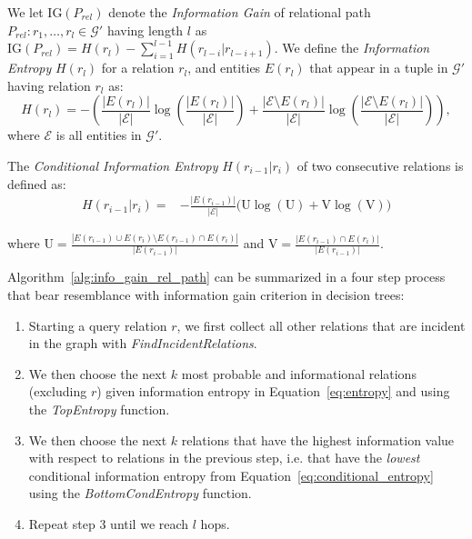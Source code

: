 \documentclass{article}
\newcommand{\set}[1]{\ensuremath{\mathcal{#1}}}
\newcommand{\entset}[0]{{\set{E}}}
\newcommand{\kg}[0]{{\set{G}}}
\begin{document}
We let $\text{IG}({P_{rel}})$ denote the \emph{Information Gain} of relational path $P_{rel}: r_1, \dotsc, r_l \in \kg'$ having length $l$  as $\text{IG}({P_{rel}}) = H(r_l) - \sum\limits_{i=1}^{l-1} H(r_{l-i}|r_{l-i+1})$.
We define the \emph{Information Entropy} $H(r_l)$ for a relation $r_l$, and entities $E(r_l)$ that appear in a tuple in $\kg'$ having relation $r_l$ as:
\begin{equation}
\scriptstyle
\label{eq:entropy}
    H(r_l) =  -\left(\frac{|E(r_l)|}{|\entset|}\log(\frac{|E(r_l)|}{|\entset|}) + \frac{|\entset \setminus E(r_l)|}{|\entset|}\log(\frac{|\entset \setminus E(r_l)|}{|\entset|})\right),
\end{equation}
where $\entset$ is all entities in $\kg'$. 

The \emph{Conditional Information Entropy} $H(r_{i-1}|r_i)$ of two consecutive relations  is defined as:
{\small
\begin{align}\label{eq:conditional_entropy}
    H(r_{i-1}|r_i) =  
    & -\frac{|E(r_{i-1})|}{|\entset|}
    \biggl (\mathrm{U} \log(\mathrm{U})
    + \mathrm{V}\log(\mathrm{V})\biggr)
\end{align}
}

where $\mathrm{U} = \frac{ |E(r_{i-1}) \cup E(r_{i}) \setminus E(r_{i-1}) \cap
    E(r_{i})|}{ |E(r_{i-1})| }$ and $\mathrm{V}=\frac{ |E(r_{i-1}) \cap E(r_{i})| }{ |E(r_{i-1})| }$.

\vspace{10pt}
Algorithm~\ref{alg:info_gain_rel_path} can be summarized in a four step process that bear resemblance with information gain criterion in decision trees: 
\begin{enumerate}
\item Starting a query relation $r$, we first collect all other relations that are incident in the graph with \textit{FindIncidentRelations}.
\item We then choose the next $k$ most probable and informational relations (excluding $r$) given information entropy in Equation~\ref{eq:entropy} and using the \textit{TopEntropy} function.
\item We then choose the next $k$ relations that have the highest information value with respect to relations in the previous step, i.e. that have the \emph{lowest} conditional information entropy from Equation~\ref{eq:conditional_entropy} using the \emph{BottomCondEntropy} function.
\item Repeat step 3 until we reach $l$ hops. 
\end{enumerate}
\end{document}
